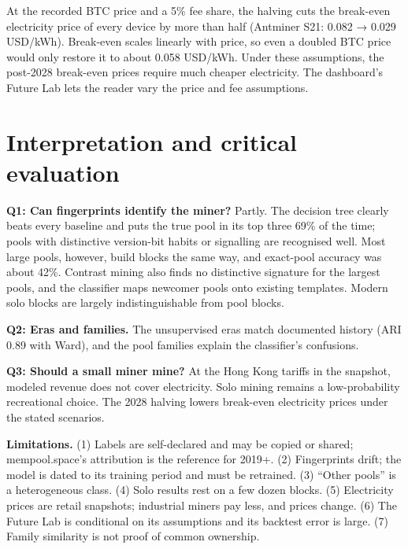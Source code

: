 \documentclass[
  11pt,
  a4paper,
]{article}
\begin{document}
At the recorded BTC price and a 5\% fee share, the halving cuts the
break-even electricity price of every device by more than half (Antminer
S21: 0.082 → 0.029 USD/kWh). Break-even scales linearly with price, so
even a doubled BTC price would only restore it to about 0.058 USD/kWh.
Under these assumptions, the post-2028 break-even prices require much
cheaper electricity. The dashboard's Future Lab lets the reader vary the
price and fee assumptions.


\section{Interpretation and critical
evaluation}\label{interpretation-and-critical-evaluation}

\textbf{Q1: Can fingerprints identify the miner?} Partly. The decision
tree clearly beats every baseline and puts the true pool in its top
three 69\% of the time; pools with distinctive version-bit habits or
signalling are recognised well. Most large pools, however, build blocks
the same way, and exact-pool accuracy was about 42\%. Contrast mining
also finds no distinctive signature for the largest pools, and the
classifier maps newcomer pools onto existing templates. Modern solo
blocks are largely indistinguishable from pool blocks.

\textbf{Q2: Eras and families.} The unsupervised eras match documented
history (ARI 0.89 with Ward), and the pool families explain the
classifier's confusions.

\textbf{Q3: Should a small miner mine?} At the Hong Kong tariffs in the
snapshot, modeled revenue does not cover electricity. Solo mining
remains a low-probability recreational choice. The 2028 halving lowers
break-even electricity prices under the stated scenarios.

\textbf{Limitations.} (1) Labels are self-declared and may be copied or
shared; mempool.space's attribution is the reference for 2019+. (2)
Fingerprints drift; the model is dated to its training period and must
be retrained. (3) ``Other pools'' is a heterogeneous class. (4) Solo
results rest on a few dozen blocks. (5) Electricity prices are retail
snapshots; industrial miners pay less, and prices change. (6) The Future
Lab is conditional on its assumptions and its backtest error is large.
(7) Family similarity is not proof of common ownership.

\end{document}

